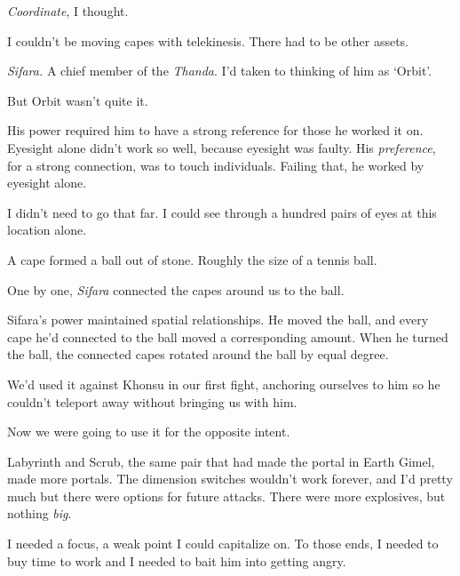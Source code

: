 \emph{Coordinate}, I thought.



I couldn't be moving capes with telekinesis.  There had to be other assets.



\emph{Sifara.  }A chief\emph{ }member of the \emph{Thanda}.  I'd taken to thinking of him as `Orbit'.



But Orbit wasn't quite it.



His power required him to have a strong reference for those he worked it on.  Eyesight alone didn't work so well, because eyesight was faulty.  His \emph{preference}, for a strong connection, was to touch individuals.  Failing that, he worked by eyesight alone.



I didn't need to go that far.  I could see through a hundred pairs of eyes at this location alone.



A cape formed a ball out of stone.  Roughly the size of a tennis ball.



One by one, \emph{Sifara }connected the capes around us to the ball.



Sifara's power maintained spatial relationships.  He moved the ball, and every cape he'd connected to the ball moved a corresponding amount.  When he turned the ball, the connected capes rotated around the ball by equal degree.



We'd used it against Khonsu in our first fight, anchoring ourselves to him so he couldn't teleport away without bringing us with him.



Now we were going to use it for the opposite intent.



Labyrinth and Scrub, the same pair that had made the portal in Earth Gimel, made more portals.  The dimension switches wouldn't work forever, and I'd pretty much but there were options for future attacks.  There were more explosives, but nothing \emph{big}.



I needed a focus, a weak point I could capitalize on.  To those ends, I needed to buy time to work and I needed to bait him into getting angry.



